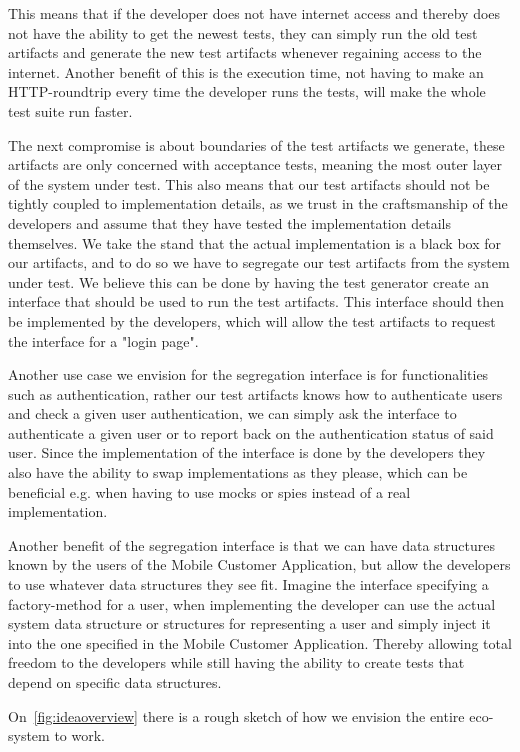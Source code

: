 This means that if the developer does not have internet access and thereby does not have the ability to get the newest tests, they can simply run the old test artifacts and generate the new test artifacts whenever regaining access to the internet.
Another benefit of this is the execution time, not having to make an HTTP-roundtrip every time the developer runs the tests, will make the whole test suite run faster.

The next compromise is about boundaries of the test artifacts we generate, these artifacts are only concerned with acceptance tests, meaning the most outer layer of the system under test. 
This also means that our test artifacts should not be tightly coupled to implementation details, as we trust in the craftsmanship of the developers and assume that they have tested the implementation details themselves.
We take the stand that the actual implementation is a black box for our artifacts, and to do so we have to segregate our test artifacts from the system under test.
We believe this can be done by having the test generator create an interface that should be used to run the test artifacts.
This interface should then be implemented by the developers, which will allow the test artifacts to request the interface for a "login page".

Another use case we envision for the segregation interface is for functionalities such as authentication, rather our test artifacts knows how to authenticate users and check a given user authentication, we can simply ask the interface to authenticate a given user or to report back on the authentication status of said user.
Since the implementation of the interface is done by the developers they also have the ability to swap implementations as they please, which can be beneficial e.g. when having to use mocks or spies instead of a real implementation.

Another benefit of the segregation interface is that we can have data structures known by the users of the Mobile Customer Application, but allow the developers to use whatever data structures they see fit.
Imagine the interface specifying a factory-method for a user, when implementing the developer can use the actual system data structure or structures for representing a user and simply inject it into the one specified in the Mobile Customer Application.
Thereby allowing total freedom to the developers while still having the ability to create tests that depend on specific data structures.

On~\autoref{fig:ideaoverview} there is a rough sketch of how we envision the entire eco-system to work.
